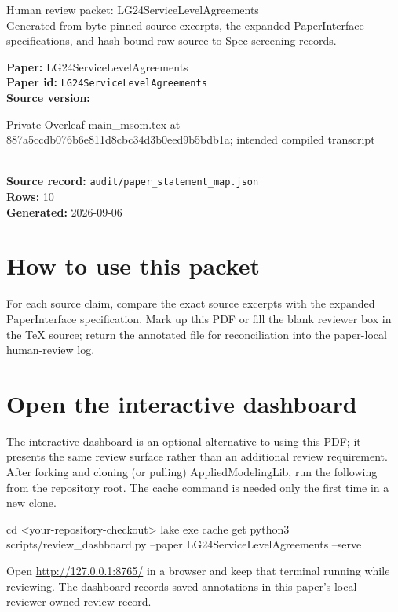 \documentclass[10pt]{article}
\begin{document}
\fontsize{9}{10}\selectfont

\begin{center}
{\LARGE Human review packet: LG24ServiceLevelAgreements}\\[0.35em]
\small Generated from byte-pinned source excerpts, the expanded PaperInterface
specifications, and hash-bound raw-source-to-Spec screening records.
\end{center}

\noindent\textbf{Paper:} LG24ServiceLevelAgreements\\
\textbf{Paper id:} \texttt{LG24ServiceLevelAgreements}\\
\textbf{Source version:} \parbox[t]{0.76\linewidth}{\raggedright Private Overleaf main\_msom.tex at 887a5ccdb076b6e811d8cbc34d3b0eed9b5bdb1a; intended compiled transcript}\\
\textbf{Source record:} \texttt{audit/paper\_statement\_map.json}\\
\textbf{Rows:} 10\\
\textbf{Generated:} 2026-09-06





\section*{How to use this packet}
For each source claim, compare the exact source excerpts with the expanded
PaperInterface specification. Mark up this PDF or fill the blank reviewer box in the TeX source;
return the annotated file for reconciliation into the paper-local human-review
log.

\section*{Open the interactive dashboard}
The interactive dashboard is an optional alternative to using this PDF; it
presents the same review surface rather than an additional review requirement.
After forking and cloning (or pulling) AppliedModelingLib, run the following from the
repository root. The cache command is needed only the first time in a new clone.
\begin{ReviewVerbatim}
cd <your-repository-checkout>
lake exe cache get
python3 scripts/review_dashboard.py --paper LG24ServiceLevelAgreements --serve
\end{ReviewVerbatim}
Open \url{http://127.0.0.1:8765/} in a browser and keep that terminal running
while reviewing. The dashboard records saved annotations in this paper's local
reviewer-owned review record.
\end{document}
